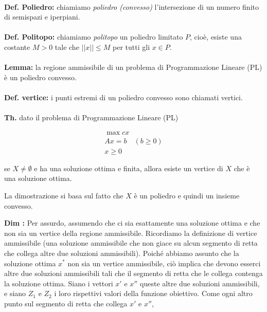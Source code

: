 \documentclass[a4paper, 11pt]{article}
\begin{document}
        \paragraph{}
        \textbf{Def. Poliedro:} chiamiamo \textit{poliedro (convesso)} l'intersezione di un numero finito di semispazi e iperpiani.
        
        \paragraph{}
        \textbf{Def. Politopo:} chiamiamo \textit{politopo} un poliedro limitato $P$, cioè, esiste una costante $M > 0$ tale che $||x|| \leq M$ per tutti gli $x \in P$.

        \paragraph{}
        \textbf{Lemma:} la regione ammissibile di un problema di Programmazione Lineare (PL) è un poliedro convesso.

        \paragraph{}
        \textbf{Def. vertice:} i punti estremi di un poliedro convesso sono chiamati vertici.


        \paragraph{}
        \textbf{Th.} dato il problema di Programmazione Lineare (PL)

        $$
        \begin{aligned}
            \max cx \\
            Ax = b \quad (b \geq 0) \\
            x \geq 0
        \end{aligned}
        $$

        se $X \neq \emptyset$ e ha una soluzione ottima e finita, allora esiste un vertice di $X$ che è una soluzione ottima.

        La dimostrazione si basa sul fatto che $X$ è un poliedro e quindi un insieme convesso.

        \textbf{Dim :} Per assurdo, assumendo che ci sia esattamente una soluzione ottima e che non sia un vertice della regione ammissibile. Ricordiamo la definizione di vertice ammissibile (una soluzione ammissibile che non giace su alcun segmento di retta che collega altre due soluzioni ammissibili). Poiché abbiamo assunto che la soluzione ottima $x^*$ non sia un vertice ammissibile, ciò implica che devono esserci altre due soluzioni ammissibili tali che il segmento di retta che le collega contenga la soluzione ottima. Siano i vettori $x'$ e $x''$ queste altre due soluzioni ammissibili, e siano $Z_1$ e $Z_2$ i loro rispettivi valori della funzione obiettivo. Come ogni altro punto sul segmento di retta che collega $x'$ e $x''$,
\end{document}
